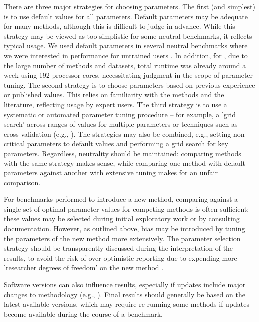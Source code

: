There are three major strategies for choosing parameters. The first (and simplest) is to use default values for all parameters. Default parameters may be adequate for many methods, although this is difficult to judge in advance. While this strategy may be viewed as too simplistic for some neutral benchmarks, it reflects typical usage. We used default parameters in several neutral benchmarks where we were interested in performance for untrained users \cite{saelens_comparisonsinglecelltrajectory_2019,couronne_randomforestlogistic_2018,schneider_mortalityriskacute_2016}. In addition, for \cite{saelens_comparisonsinglecelltrajectory_2019}, due to the large number of methods and datasets, total runtime was already around a week using 192 processor cores, necessitating judgment in the scope of parameter tuning. The second strategy is to choose parameters based on previous experience or published values. This relies on familiarity with the methods and the literature, reflecting usage by expert users. The third strategy is to use a systematic or automated parameter tuning procedure -- for example, a 'grid search' across ranges of values for multiple parameters or techniques such as cross-validation (e.g., \cite{saelens_comprehensiveevaluationmodule_2018}). The strategies may also be combined, e.g., setting non-critical parameters to default values and performing a grid search for key parameters. Regardless, neutrality should be maintained: comparing methods with the same strategy makes sense, while comparing one method with default parameters against another with extensive tuning makes for an unfair comparison.

For benchmarks performed to introduce a new method, comparing against a single set of optimal parameter values for competing methods is often sufficient; these values may be selected during initial exploratory work or by consulting documentation. However, as outlined above, bias may be introduced by tuning the parameters of the new method more extensively. The parameter selection strategy should be transparently discussed during the interpretation of the results, to avoid the risk of over-optimistic reporting due to expending more 'researcher degrees of freedom' on the new method \cite{boulesteix_tensimplerules_2015,hu_parametertuningkey_2019}.

Software versions can also influence results, especially if updates include major changes to methodology (e.g., \cite{vaquero-garcia_leafcuttervsmajiq_2018}). Final results should generally be based on the latest available versions, which may require re-running some methods if updates become available during the course of a benchmark.

